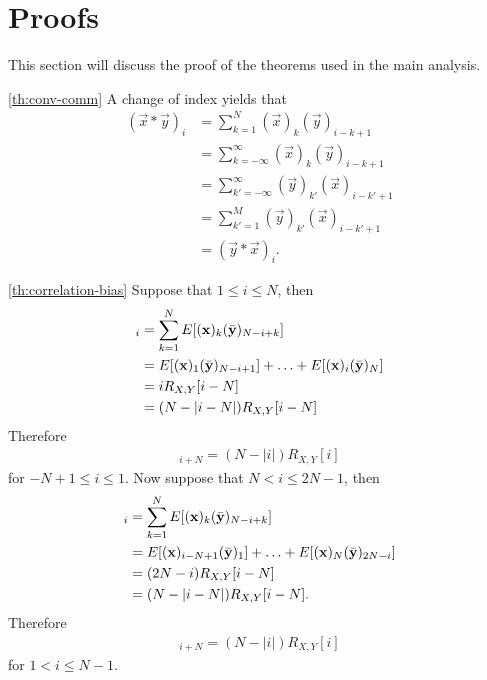 \documentclass[a4paper, openany, oneside]{memoir}
\begin{document}
\section{Proofs}
\label{sec:proofs}
This section will discuss the proof of the theorems used in the main analysis.

\begin{blockProofTheorem}{\ref{th:conv-comm}}
    A change of index yields that
    \begin{align*}
        (\vec{x} \ast \vec{y})_i &= \sum_{k=1}^{N} (\vec{x})_k (\vec{y})_{i-k+1} \\
        &= \sum_{k=-\infty}^{\infty} (\vec{x})_k (\vec{y})_{i-k+1} \\
        &= \sum_{k'=-\infty}^{\infty} (\vec{y})_{k'} (\vec{x})_{i-k'+1} \\
        &= \sum_{k'=1}^{M} (\vec{y})_{k'} (\vec{x})_{i-k'+1} \\
        &= (\vec{y} \ast \vec{x})_i.
    \end{align*}
\end{blockProofTheorem}

\begin{blockProofTheorem}{\ref{th:correlation-bias}}
    Suppose that $1 \le i \le N$, then
    \begin{align*}
        [E(\vec{x} \circ \vec{y})]_i &= \sum_{k=1}^N E[(\vec{x})_k (\conj{\vec{y}})_{N-i+k}] \\
        &= E[(\vec{x})_1 (\conj{\vec{y}})_{N-i+1}] + \ldots + E[(\vec{x})_i (\conj{\vec{y}})_{N}] \\
        &= i R_{X,Y}[i-N] \\
        &= (N-|i-N|) R_{X,Y}[i-N]
    \end{align*}
    Therefore
    \begin{align*}
        [E(\vec{x} \circ \vec{y})]_{i+N} = (N-|i|) R_{X,Y}[i]
    \end{align*}
    for $-N + 1\le i \le 1$. Now suppose that $N < i \le 2N-1$, then
    \begin{align*}
        [E(\vec{x} \circ \vec{y})]_i &= \sum_{k=1}^N E[(\vec{x})_k (\conj{\vec{y}})_{N-i+k}] \\
        &= E[(\vec{x})_{i-N+1} (\conj{\vec{y}})_{1}] + \ldots + E[(\vec{x})_{N} (\conj{\vec{y}})_{2N-i}] \\
        &= (2N-i) R_{X,Y}[i-N] \\
        &= (N-|i-N|) R_{X,Y}[i-N].
    \end{align*}
    Therefore
    \begin{align*}
        [E(\vec{x} \circ \vec{y})]_{i+N} = (N-|i|) R_{X,Y}[i]
    \end{align*}
    for $1 < i \le N-1$.
\end{blockProofTheorem}
\end{document}
